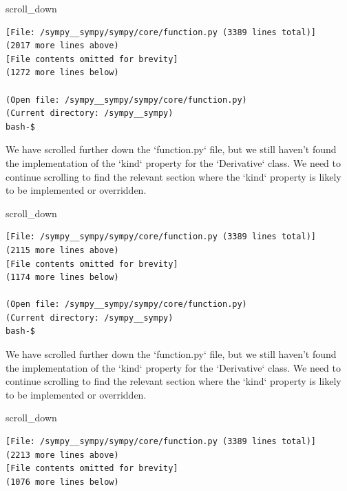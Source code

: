 {\begin{agentbox}
\hrulefill
\begin{CodeVerbatim}[breaklines=true, breakanywhere=true]
scroll_down
\end{CodeVerbatim}
\end{agentbox}
\begin{observationbox}\begin{Verbatim}[breaklines=true, breakanywhere=true]
[File: /sympy__sympy/sympy/core/function.py (3389 lines total)]
(2017 more lines above)
[File contents omitted for brevity]
(1272 more lines below)

(Open file: /sympy__sympy/sympy/core/function.py)
(Current directory: /sympy__sympy)
bash-$
\end{Verbatim}
\end{observationbox}
\begin{agentbox}
We have scrolled further down the `function.py` file, but we still haven't found the implementation of the `kind` property for the `Derivative` class. We need to continue scrolling to find the relevant section where the `kind` property is likely to be implemented or overridden.



\hrulefill
\begin{CodeVerbatim}[breaklines=true, breakanywhere=true]
scroll_down
\end{CodeVerbatim}
\end{agentbox}
\begin{observationbox}\begin{Verbatim}[breaklines=true, breakanywhere=true]
[File: /sympy__sympy/sympy/core/function.py (3389 lines total)]
(2115 more lines above)
[File contents omitted for brevity]
(1174 more lines below)

(Open file: /sympy__sympy/sympy/core/function.py)
(Current directory: /sympy__sympy)
bash-$
\end{Verbatim}
\end{observationbox}
\begin{agentbox}
We have scrolled further down the `function.py` file, but we still haven't found the implementation of the `kind` property for the `Derivative` class. We need to continue scrolling to find the relevant section where the `kind` property is likely to be implemented or overridden.



\hrulefill
\begin{CodeVerbatim}[breaklines=true, breakanywhere=true]
scroll_down
\end{CodeVerbatim}
\end{agentbox}
\begin{observationbox}\begin{Verbatim}[breaklines=true, breakanywhere=true]
[File: /sympy__sympy/sympy/core/function.py (3389 lines total)]
(2213 more lines above)
[File contents omitted for brevity]
(1076 more lines below)


\end{Verbatim}
\end{observationbox}}
